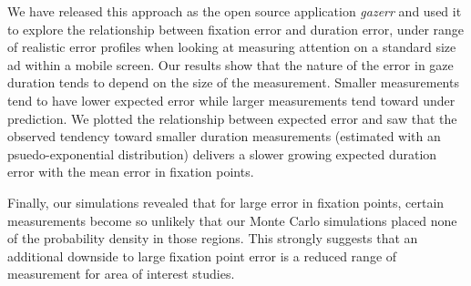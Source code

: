 \documentclass[sigconf]{acmart}
\numberwithin{equation}{section}
\begin{document}
We have released this approach as the open source application \textit{gazerr} and 
used it to explore the relationship between fixation error and duration error, under
range of realistic error profiles when looking at measuring attention on a standard
size ad within a mobile screen. Our results show that the nature
of the error in gaze duration tends to depend on the size of the measurement. 
Smaller measurements tend to have lower expected error while larger measurements 
tend toward under prediction. 
We plotted the relationship between expected error and saw that the observed 
tendency toward smaller duration measurements 
(estimated with an psuedo-exponential distribution) delivers a slower growing
expected duration error with the mean error in fixation points.

Finally, our simulations revealed that for large error in fixation points, 
certain measurements become so unlikely that our Monte Carlo simulations placed 
none of the probability density in those regions. 
This strongly suggests that an additional downside to large fixation point error
is a reduced range of measurement for area of interest studies.



\end{document}
